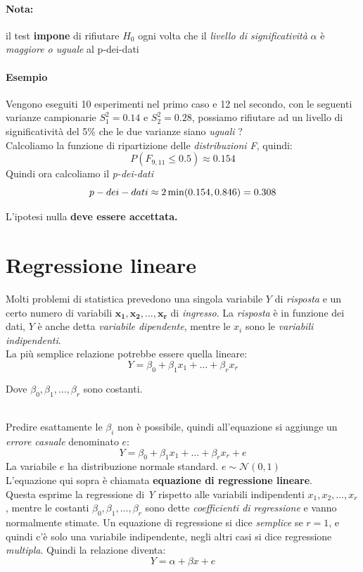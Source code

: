 \documentclass[]{article}
\begin{document}
    \paragraph{Nota:} il test \textbf{impone} di rifiutare $H_0$ ogni volta che il \textit{livello di significatività} $\alpha$ è \textit{maggiore o uguale} al p-dei-dati
    \paragraph{Esempio} Vengono eseguiti 10 esperimenti nel primo caso e 12 nel secondo, con le seguenti varianze campionarie $S^2_1 = 0.14$ e $S^2_2 = 0.28$, possiamo rifiutare ad un livello di significatività del 5\% che le due varianze siano \textit{uguali} ? \\
    Calcoliamo la funzione di ripartizione delle \textit{distribuzioni F}, quindi:
    \[ P(F_{9,11} \leq 0.5) \approx \boldsymbol{0.154} \]
    Quindi ora calcoliamo il \textit{p-dei-dati}
    \[ p-dei-dati \approx 2 \min(0.154, \space 0.846) = 0.308 \]
    \centerline{L'ipotesi nulla \textbf{deve essere accettata. }}
    \newpage
    \section{Regressione lineare}
    Molti problemi di statistica prevedono una singola variabile $Y$ di \emph{risposta} e un certo numero di variabili $\boldsymbol{x_1, x_2, \ldots, x_r}$ di \emph{ingresso}. La \emph{risposta} è in funzione dei dati, $Y$ è anche detta \emph{variabile dipendente}, mentre le $x_i$ sono le \emph{variabili indipendenti}.\\
    La più semplice relazione potrebbe essere quella lineare:
    \[ Y = \beta_0 + \beta_1x_1 + \ldots  + \beta_rx_r \]
    \centerline{Dove $\beta_0, \beta_1, \ldots, \beta_r$ sono costanti.} \\[2ex]
    Predire esattamente le $\beta_i$ non è possibile, quindi all'equazione si aggiunge un \emph{errore casuale} denominato $e$:
    \[ Y = \beta_0 + \beta_1x_1 + \ldots + \beta_rx_r + e \]
    La variabile $e$ ha distribuzione normale standard. $e \sim \mathcal N(0,1)$ \\
    L'equazione qui sopra è chiamata \textbf{equazione di regressione lineare}. \\
    Questa esprime la regressione di \emph{Y} rispetto alle variabili indipendenti $x_1, x_2, \ldots, x_r$, mentre le costanti $\beta_0, \beta_1, \ldots, \beta_r$ sono dette \emph{coefficienti di regressione} e vanno normalmente stimate.
    Un equazione di regressione si dice \emph{semplice} se $r = 1$, e quindi c'è solo una variabile indipendente, negli altri casi si dice regressione \emph{multipla}.
    Quindi la relazione diventa:
    \[ Y = \alpha + \beta x + e \]
\end{document}
